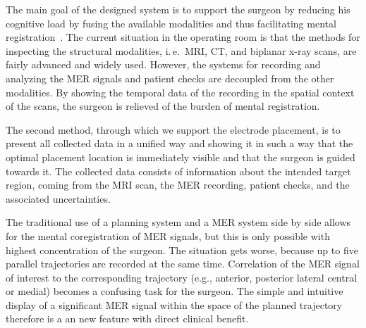 \documentclass[review]{vgtc}                 %
\begin{document}

The main goal of the designed system is to support the surgeon by reducing his cognitive load by fusing the available modalities and thus facilitating mental registration~\cite{Tory1998}. The current situation in the operating room is that the methods for inspecting the structural modalities, i.\,e.~MRI, CT, and biplanar x-ray scans, are fairly advanced and widely used. However, the systems for recording and analyzing the MER signals and patient checks are decoupled from the other modalities. By showing the temporal data of the recording in the spatial context of the scans, the surgeon is relieved of the burden of mental registration.


The second method, through which we support the electrode placement, is to present all collected data in a unified way and showing it in such a way that the optimal placement location is immediately visible and that the surgeon is guided towards it. The collected data consists of information about the intended target region, coming from the MRI scan, the MER recording, patient checks, and the associated uncertainties.

The traditional use of a planning system and a MER system side by side allows for the mental coregistration of MER signals, but this is only possible with highest concentration of the surgeon. The situation gets worse, because up to five parallel trajectories are recorded at the same time. Correlation of the MER signal of interest to the corresponding trajectory (e.g., anterior, posterior lateral central or medial) becomes a confusing task for the surgeon. The simple and intuitive display of a significant MER signal within the space of the planned trajectory therefore is a an new feature with direct clinical benefit.   
\end{document}
